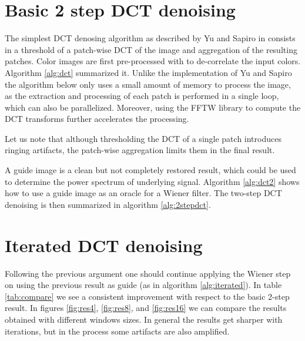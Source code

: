 \documentclass{ipol}
\begin{document}




\section{Basic 2 step DCT denoising}
The simplest DCT denosing algorithm as described by Yu and Sapiro in \cite{dct2011} consists in a threshold of a patch-wise DCT of the image and aggregation of the resulting patches. Color images are first pre-processed with to de-correlate the input colors. Algorithm \ref{alg:dct} summarized it. Unlike the implementation of Yu and Sapiro the algorithm below  only uses a small amount of memory to process the image, as the extraction and processing of each patch is performed in a single loop, which can also be parallelized. Moreover, using the FFTW library to compute the DCT transforms further accelerates the processing. 

Let us note that although thresholding the DCT of a single patch introduces ringing artifacts, the patch-wise aggregation limits them in the final result. 

A guide image is a clean but not completely restored result, which could be used to determine the power spectrum of underlying signal. Algorithm \ref{alg:dct2} shows how to use a guide image as an oracle for a Wiener filter.
The two-step DCT denoising is then summarized in algorithm \ref{alg:2stepdct}. 


\section{Iterated DCT denoising}

Following the previous argument one should continue applying the Wiener step on using the previous result as guide (as in algorithm \ref{alg:iterated}). In table \ref{tab:compare} we see a consistent improvement with respect to the basic 2-step result. 
In figures \ref{fig:res4}, \ref{fig:res8}, and \ref{fig:res16} we can compare the results obtained with different windows sizes.
In general the results get sharper with iterations, but in the process some artifacts are also amplified.
\end{document}
